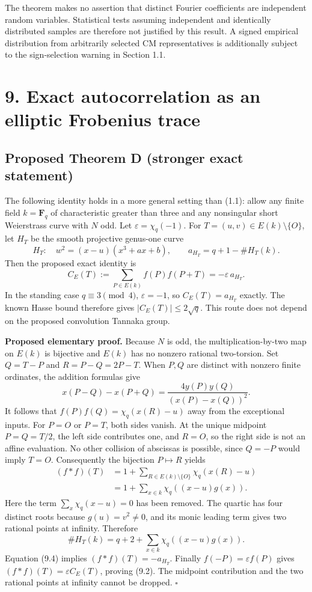 \documentclass[
  11pt,
  a4paper,
]{article}
\begin{document}
The theorem makes no assertion that distinct Fourier coefficients are
independent random variables. Statistical tests assuming independent and
identically distributed samples are therefore not justified by this
result. A signed empirical distribution from arbitrarily selected CM
representatives is additionally subject to the sign-selection warning in
Section 1.1.


\section{9. Exact autocorrelation as an elliptic Frobenius trace}
\label{autocorrelation-elliptic-trace}
\subsection{Proposed Theorem D (stronger exact statement)}
The following identity holds in a more general setting than (1.1):
allow any finite field \(k=\mathbf F_q\) of characteristic greater
than three and any nonsingular short Weierstrass curve with \(N\) odd.
Let \(\varepsilon=\chi_q(-1)\). For \(T=(u,v)\in E(k)\setminus\{O\}\),
let \(H_T\) be the smooth projective genus-one curve
\[
H_T:\quad w^2=(x-u)(x^3+ax+b),\qquad
 a_{H_T}=q+1-\#H_T(k).
\tag{9.1}
\]
Then the proposed exact identity is
\[
\boxed{C_E(T):=\sum_{P\in E(k)}f(P)f(P+T)
 =-\varepsilon\,a_{H_T}.}
\tag{9.2}
\]
In the standing case \(q\equiv3\pmod4\), \(\varepsilon=-1\), so
\(C_E(T)=a_{H_T}\) exactly. The known Hasse bound therefore gives
\(\lvert C_E(T)\rvert\le2\sqrt q\). This route does not depend
on the proposed convolution Tannaka group.

\textbf{Proposed elementary proof.}
Because \(N\) is odd, the multiplication-by-two map on \(E(k)\) is
bijective and \(E(k)\) has no nonzero rational two-torsion. Set
\(Q=T-P\) and \(R=P-Q=2P-T\). When \(P,Q\) are distinct with
nonzero finite ordinates, the addition formulas give
\[
x(P-Q)-x(P+Q)
=\frac{4y(P)y(Q)}{(x(P)-x(Q))^2}.
\tag{9.3}
\]
It follows that \(f(P)f(Q)=\chi_q(x(R)-u)\) away from the
exceptional inputs. For \(P=O\) or \(P=T\), both sides vanish.
At the unique midpoint \(P=Q=T/2\), the left side contributes one,
and \(R=O\), so the right side is not an affine evaluation.
No other collision of abscissas is possible, since \(Q=-P\) would
imply \(T=O\). Consequently the bijection \(P\mapsto R\) yields
\[
\begin{aligned}
(f*f)(T)&=1+\sum_{R\in E(k)\setminus\{O\}}
  \chi_q(x(R)-u)\\
 &=1+\sum_{x\in k}\chi_q((x-u)g(x)).
\end{aligned}
\tag{9.4}
\]
Here the term \(\sum_x\chi_q(x-u)=0\) has been removed.
The quartic has four distinct roots because \(g(u)=v^2\ne0\),
and its monic leading term gives two rational points at infinity.
Therefore
\[
 \#H_T(k)=q+2+\sum_{x\in k}\chi_q((x-u)g(x)).
\tag{9.5}
\]
Equation (9.4) implies \((f*f)(T)=-a_{H_T}\). Finally
\(f(-P)=\varepsilon f(P)\) gives \((f*f)(T)=\varepsilon C_E(T)\),
proving (9.2). The midpoint contribution and the two rational points
at infinity cannot be dropped. \(\square\)
\end{document}
